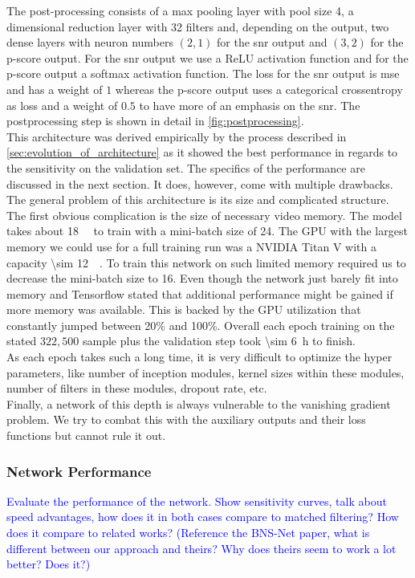 The post-processing consists of a max pooling layer with pool size 4, a dimensional reduction layer with 32 filters and, depending on the output, two dense layers with neuron numbers $(2,1)$ for the \gls{snr} output and $(3,2)$ for the p-score output. For the \gls{snr} output we use a ReLU activation function and for the p-score output a softmax activation function. The loss for the \gls{snr} output is \gls{mse} and has a weight of $1$ whereas the p-score output uses a categorical crossentropy as loss and a weight of $0.5$ to have more of an emphasis on the \gls{snr}. The postprocessing step is shown in detail in \autoref{fig:postprocessing}.\medskip\\
This architecture was derived empirically by the process described in \autoref{sec:evolution_of_architecture} as it showed the best performance in regards to the sensitivity on the validation set. The specifics of the performance are discussed in the next section. It does, however, come with multiple drawbacks. The general problem of this architecture is its size and complicated structure. The first obvious complication is the size of necessary video memory. The model takes about \SI{18}{\giga\byte} to train with a mini-batch size of 24. The GPU with the largest memory we could use for a full training run was a NVIDIA Titan V with a capacity \SI{\sim 12}{\giga\byte}. To train this network on such limited memory required us to decrease the mini-batch size to 16. Even though the network just barely fit into memory and Tensorflow stated that additional performance might be gained if more memory was available. This is backed by the GPU utilization that constantly jumped between 20\% and 100\%. Overall each epoch training on the stated $322,500$ sample plus the validation step took \SI{\sim 6}{\hour} to finish.\\
As each epoch takes such a long time, it is very difficult to optimize the hyper parameters, like number of inception modules, kernel sizes within these modules, number of filters in these modules, dropout rate, etc.\\
Finally, a network of this depth is always vulnerable to the vanishing gradient problem. We try to combat this with the auxiliary outputs and their loss functions but cannot rule it out.

\subsubsection{Network Performance}\label{sec:network_performance}
\textcolor{blue}{Evaluate the performance of the network. Show sensitivity curves, talk about speed advantages, how does it in both cases compare to matched filtering? How does it compare to related works? (Reference the BNS-Net paper, what is different between our approach and theirs? Why does theirs seem to work a lot better? Does it?)}
